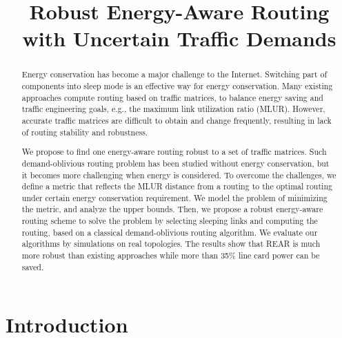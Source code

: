 \documentclass[conference]{IEEEtran}
\begin{document}
\title{Robust Energy-Aware Routing with Uncertain Traffic Demands}


\author{
\and
{}
\and
{}
}


\maketitle

\begin{abstract}
Energy conservation has become a major challenge to the Internet. Switching part of components into sleep mode is an effective way for energy conservation. Many existing approaches compute routing based on traffic matrices, to balance energy saving and traffic engineering goals, e.g., the maximum link utilization ratio (MLUR). However, accurate traffic matrices are difficult to obtain and change frequently, resulting in lack of routing stability and robustness.

We propose to find one energy-aware routing robust to a set of traffic matrices. Such demand-oblivious routing problem has been studied without energy conservation, but it becomes more challenging when energy is considered. To overcome the challenges, we define a metric that reflects the MLUR distance from a routing to the optimal routing under certain energy conservation requirement. We model the problem of minimizing the metric, and analyze the upper bounds. Then, we propose a robust energy-aware routing scheme to solve the problem by selecting sleeping links and computing the routing, based on a classical demand-oblivious routing algorithm. We evaluate our algorithms by simulations on real topologies. The results show that REAR is much more robust than existing approaches while more than 35\% line card power can be saved.
\end{abstract}

\IEEEpeerreviewmaketitle

\section{Introduction}
\label{introduction}
\end{document}
